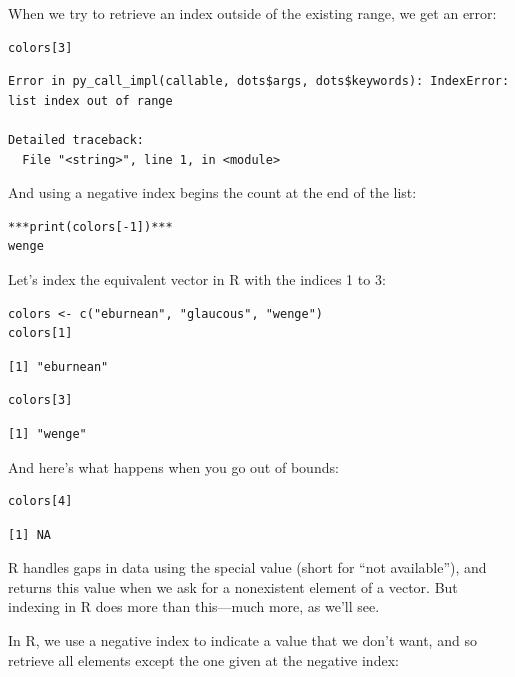 When we try to retrieve an index outside of the existing range, we get an error:

\begin{lstlisting}
colors[3]
\end{lstlisting}

\begin{lstlisting}
Error in py_call_impl(callable, dots$args, dots$keywords): IndexError: list index out of range

Detailed traceback: 
  File "<string>", line 1, in <module>
\end{lstlisting}

And using a negative index begins the count at the end of the list:

\begin{lstlisting}
***print(colors[-1])***
wenge
\end{lstlisting}

Let's index the equivalent vector in R with the indices 1 to 3:

\begin{lstlisting}
colors <- c("eburnean", "glaucous", "wenge")
colors[1]
\end{lstlisting}

\begin{lstlisting}
[1] "eburnean"
\end{lstlisting}

\begin{lstlisting}
colors[3]
\end{lstlisting}

\begin{lstlisting}
[1] "wenge"
\end{lstlisting}

And here's what happens when you go out of bounds:

\begin{lstlisting}
colors[4]
\end{lstlisting}

\begin{lstlisting}
[1] NA
\end{lstlisting}

R handles gaps in data using the special value  (short for ``not available''),
and returns this value when we ask for a nonexistent element of a vector.
But indexing in R does more than this---much more, as we'll see.

In R,
we use a negative index to indicate a value that we don't want, and so retrieve all elements except the one given at the negative index:

